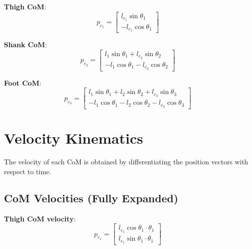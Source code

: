 \documentclass[11pt,a4paper]{article}
\newcommand{\vc}[1]{\bm{#1}}
\newcommand{\dt}[1]{\dot{#1}}
\def\vc#1{#1}%
\def\dt#1{#1}%
\def\bm#1{#1}%
\begin{document}
\begin{keybox}
\textbf{Thigh CoM}:
\begin{equation}
    \vc{p}_{c_1} = \begin{bmatrix} l_{c_1} \sin\theta_1 \\ -l_{c_1} \cos\theta_1 \end{bmatrix}
    \label{eq:com1}
\end{equation}

\textbf{Shank CoM}:
\begin{equation}
    \vc{p}_{c_2} = \begin{bmatrix}
        l_1 \sin\theta_1 + l_{c_2} \sin\theta_2 \\
        -l_1 \cos\theta_1 - l_{c_2} \cos\theta_2
    \end{bmatrix}
    \label{eq:com2}
\end{equation}

\textbf{Foot CoM}:
\begin{equation}
    \vc{p}_{c_3} = \begin{bmatrix}
        l_1 \sin\theta_1 + l_2 \sin\theta_2 + l_{c_3} \sin\theta_3 \\
        -l_1 \cos\theta_1 - l_2 \cos\theta_2 - l_{c_3} \cos\theta_3
    \end{bmatrix}
    \label{eq:com3}
\end{equation}
\end{keybox}

\section{Velocity Kinematics}

The velocity of each CoM is obtained by differentiating the position vectors
with respect to time.

\subsection{CoM Velocities (Fully Expanded)}

\textbf{Thigh CoM velocity}:
\begin{equation}
\boxed{
    \dt{\vc{p}}_{c_1} = \begin{bmatrix}
        l_{c_1} \cos\theta_1 \cdot \dt{\theta}_1 \\
        l_{c_1} \sin\theta_1 \cdot \dt{\theta}_1
    \end{bmatrix}
}
\label{eq:vel_com1}
\end{equation}
\end{document}
